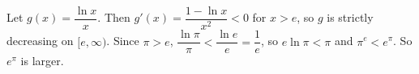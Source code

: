 Let $g(x)=\dfrac{\ln x}x$. Then $g'(x)=\dfrac{1-\ln x}{x^2}<0$ for $x>e$, so $g$ is strictly decreasing on $[e,\infty)$. Since $\pi>e$, $\dfrac{\ln\pi}\pi<\dfrac{\ln e}e=\dfrac1e$, so $e\ln\pi<\pi$ and $\pi^e<e^\pi$. So $\boxed{e^\pi}$ is larger.
